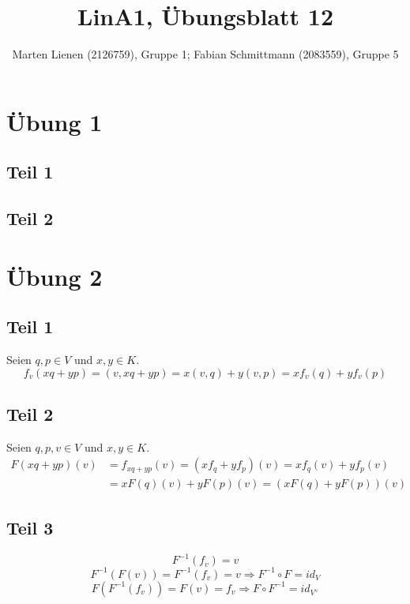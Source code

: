 \documentclass[a4paper,10pt]{article}
\title{LinA1, Übungsblatt 12}
\author{Marten Lienen (2126759), Gruppe 1; Fabian Schmittmann (2083559), Gruppe 5}
\begin{document}
\maketitle

\section*{Übung 1}

\subsection*{Teil 1}

\subsection*{Teil 2}

\section*{Übung 2}

\subsection*{Teil 1}

Seien $q, p \in V$ und $x, y \in K$.
\begin{equation}
 f_v(x q + y p) = (v, xq + yp) = x(v, q) + y(v, p) = x f_v(q) + y f_v(p)
\end{equation}

\subsection*{Teil 2}

Seien $q, p, v \in V$ und $x, y \in K$.
\begin{align*}
 F(xq + yp)(v) & = f_{xq + yp}(v) = (xf_q + yf_p)(v) = xf_q(v) + yf_p(v)\\
 & = xF(q)(v) + yF(p)(v) = (xF(q) + yF(p))(v)
\end{align*}

\subsection*{Teil 3}

\begin{equation}
 F^{-1}(f_v) = v
\end{equation}
\begin{equation}
 F^{-1}(F(v)) = F^{-1}(f_v) = v \Rightarrow F^{-1} \circ F = id_V
\end{equation}
\begin{equation}
 F(F^{-1}(f_v)) = F(v) = f_v \Rightarrow F \circ F^{-1} = id_{V^\vee}
\end{equation}
\end{document}

